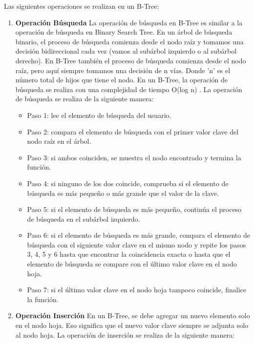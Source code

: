 \documentclass{article}
\begin{document}
Las siguientes operaciones se realizan en un B-Tree:

	\begin{enumerate}

		\item \textbf{Operación Búsqueda}
		La operación de búsqueda en B-Tree es similar a la operación de búsqueda en Binary Search Tree. En un árbol de búsqueda binario, el proceso de búsqueda comienza desde el nodo raíz y tomamos una decisión bidireccional cada vez (vamos al subárbol izquierdo o al subárbol derecho). En B-Tree también el proceso de búsqueda comienza desde el nodo raíz, pero aquí siempre tomamos una decisión de n vías. Donde 'n' es el número total de hijos que tiene el nodo. En un B-Tree, la operación de búsqueda se realiza con una complejidad de tiempo O(log n) . La operación de búsqueda se realiza de la siguiente manera:
		
		\begin{itemize}
		\item Paso 1: lee el elemento de búsqueda del usuario.
		\item Paso 2: compara el elemento de búsqueda con el primer valor clave del nodo raíz en el árbol. 
		\item Paso 3: si ambos coinciden, se muestra el nodo encontrado y termina la función.
		\item Paso 4: si ninguno de los dos coincide, comprueba si el elemento de búsqueda es más pequeño o más grande que el valor de la clave.
		\item Paso 5: si el elemento de búsqueda es más pequeño, continúa el proceso de búsqueda en el subárbol izquierdo.
		\item Paso 6: si el elemento de búsqueda es más grande, compara el elemento de búsqueda con el siguiente valor clave en el mismo nodo y repite los pasos 3, 4, 5 y 6 hasta que encontrar la coincidencia exacta o hasta que el elemento de búsqueda se compare con el último valor clave en el nodo hoja.
		\item Paso 7: si el último valor clave en el nodo hoja tampoco coincide, finalice la función.
		\end{itemize}


			\item \textbf{Operación Inserción}
			En un B-Tree, se debe agregar un nuevo elemento solo en el nodo hoja. Eso significa que el nuevo valor clave siempre se adjunta solo al nodo hoja. La operación de inserción se realiza de la siguiente manera:
			

\end{enumerate}
\end{document}

